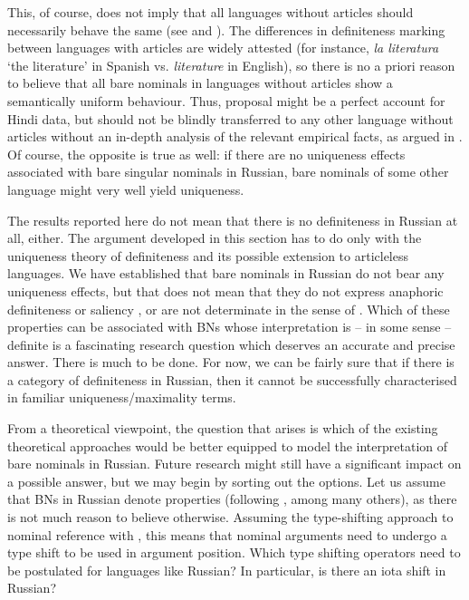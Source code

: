 \documentclass[output=paper,colorlinks,citecolor=brown]{langscibook}
\begin{document}
This, of course, does not imply that all languages without articles should necessarily behave the same (see \citealt{Liu.etal2023} and \citealt{liusalt}). The differences in definiteness marking between languages with articles are widely attested (for instance, \textit{la literatura} `the literature' in Spanish vs. \textit{literature} in English), so there is no a priori reason to believe that all bare nominals in languages without articles show a semantically uniform behaviour. Thus,  proposal might be a perfect account for Hindi data, but should not be blindly transferred to any other language without articles without an in-depth analysis of the relevant empirical facts, as argued in \citet{Liu.etal2023}. Of course, the opposite is true as well: if there are no uniqueness effects associated with bare singular nominals in Russian, bare nominals of some other language might very well yield uniqueness. 

The results reported here do not mean that there is no definiteness in Russian at all, either. The argument developed in this section has to do only with the uniqueness theory of definiteness and its possible extension to articleless languages. We have established that bare nominals in Russian do not bear any uniqueness effects, but that does not mean that they do not express anaphoric definiteness or saliency \citep[cf.][]{heusinger97, heusinger13}, or are not determinate in the sense of \citet{coppockbeaver15}. Which of these properties can be associated with BNs whose interpretation is -- in some sense -- definite is a fascinating research question which deserves an accurate and precise answer. There is much to be done. For now, we can be fairly sure that if there is a category of definiteness in Russian, then it cannot be successfully characterised in familiar uniqueness/maximality terms. 

From a theoretical viewpoint, the question that arises is which of the existing theoretical approaches would be better equipped to model the interpretation of bare nominals in Russian. Future research might still have a significant impact on a possible answer, but we may begin by sorting out the options. Let us assume that BNs in Russian denote properties (following \citealt{chierchia98}, among many others), as there is not much reason to believe otherwise. Assuming the type-shifting approach to nominal reference with \citet{partee87}, this means that nominal arguments need to undergo a type shift to be used in argument position. Which type shifting operators need to be postulated for languages like Russian? In particular, is there an iota shift in Russian? 
\end{document}
